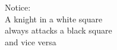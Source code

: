 \documentclass[preview]{standalone}
\begin{document}
\begin{center}
Notice: \\ A knight in a white square \\ always attacks a black square \\ and vice versa
\end{center}
\end{document}
